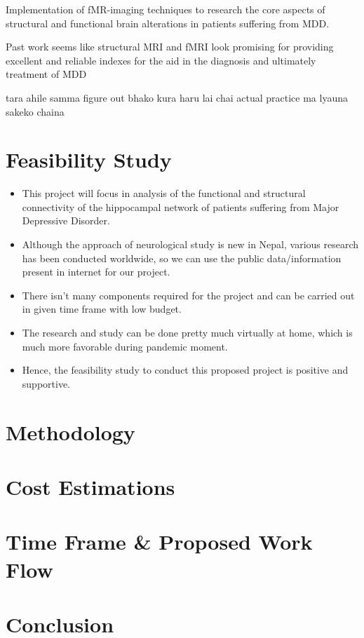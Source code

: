 \documentclass{article}
\begin{document}

Implementation of fMR-imaging techniques to research the core aspects
of structural and functional brain alterations in patients suffering
from MDD.

Past work seems like structural MRI and fMRI look promising for
providing excellent and reliable indexes for the aid in the diagnosis
and ultimately treatment of MDD



tara ahile samma figure out bhako kura haru lai chai actual practice
ma lyauna sakeko chaina

\section{Feasibility Study}

\begin{itemize}

  \item This project will focus in analysis of the functional and
    structural connectivity of the hippocampal network of patients
    suffering from Major Depressive Disorder.

  \item Although the approach of neurological study is new in Nepal,
    various research has been conducted worldwide, so we can use the
    public data/information present in internet for our project.

  \item There isn't many components required for the project and can
    be carried out in given time frame with low budget.

  \item The research and study can be done pretty much virtually at
    home, which is much more favorable during pandemic moment.

  \item Hence, the feasibility study to conduct this proposed project
    is positive and supportive.

\end{itemize}

\section{Methodology}
\section{Cost Estimations}
\section{Time Frame \& Proposed Work Flow}
\section{Conclusion}
\end{document}
